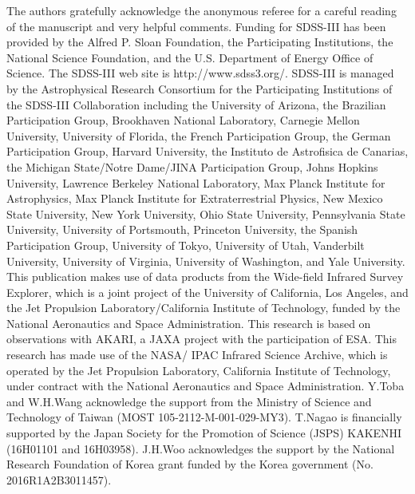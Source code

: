 \documentclass[twocolumn]{aastex6}
\begin{document}
\acknowledgments
The authors gratefully acknowledge the anonymous referee for a careful reading of the manuscript and very helpful comments.
Funding for SDSS-III has been provided by the Alfred P. Sloan Foundation, the Participating Institutions, the National Science Foundation, and the U.S. Department of Energy Office of Science. The SDSS-III web site is http://www.sdss3.org/.
SDSS-III is managed by the Astrophysical Research Consortium for the Participating Institutions of the SDSS-III Collaboration including the University of Arizona, the Brazilian Participation Group, Brookhaven National Laboratory, Carnegie Mellon University, University of Florida, the French Participation Group, the German Participation Group, Harvard University, the Instituto de Astrofisica de Canarias, the Michigan State/Notre Dame/JINA Participation Group, Johns Hopkins University, Lawrence Berkeley National Laboratory, Max Planck Institute for Astrophysics, Max Planck Institute for Extraterrestrial Physics, New Mexico State University, New York University, Ohio State University, Pennsylvania State University, University of Portsmouth, Princeton University, the Spanish Participation Group, University of Tokyo, University of Utah, Vanderbilt University, University of Virginia, University of Washington, and Yale University.
This publication makes use of data products from the Wide-field Infrared Survey Explorer, which is a joint project of the University of California, Los Angeles, and the Jet Propulsion Laboratory/California Institute of Technology, funded by the National Aeronautics and Space Administration. 
This research is based on observations with AKARI, a JAXA project with the participation of ESA.
This research has made use of the NASA/ IPAC Infrared Science Archive, which is operated by the Jet Propulsion Laboratory, California Institute of Technology, under contract with the National Aeronautics and Space Administration.
Y.Toba and W.H.Wang acknowledge the support from the Ministry of Science and Technology
of Taiwan (MOST 105-2112-M-001-029-MY3).
T.Nagao is financially supported by the Japan Society for the Promotion of Science (JSPS) KAKENHI (16H01101 and 16H03958).
J.H.Woo acknowledges the support by the National Research Foundation of Korea grant funded by the Korea government (No. 2016R1A2B3011457).
\end{document}
